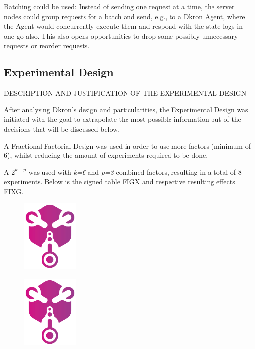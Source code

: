 \documentclass[runningheads]{llncs}
\begin{document}
Batching could be used: Instead of sending one request at a time, the server nodes could group requests for a batch
and send, e.g., to a Dkron Agent, where the Agent would concurrently execute them and respond with the state logs
in one go also. This also opens opportunities to drop some possibly unnecessary requests or reorder requests.


\subsection{Experimental Design}
DESCRIPTION AND JUSTIFICATION OF THE EXPERIMENTAL DESIGN

After analysing Dkron's design and particularities, the Experimental Design was initiated with the
goal to extrapolate the most possible information out of the decisions that will be discussed below.

A Fractional Factorial Design was used in order to use more factors (minimum of 6), whilst reducing
the amount of experiments required to be done.

A $2^{k-p}$ was used with \textit{k=6} and \textit{p=3} combined factors, resulting
in a total of 8 experiments. Below is the signed table FIGX and respective resulting effects FIXG.

\begin{figure}
\centering
\includegraphics[width=0.25\textwidth]{media/dkron-logo.png}
\end{figure}

\begin{figure}
\centering
\includegraphics[width=0.25\textwidth]{media/dkron-logo.png}
\end{figure}
\end{document}
